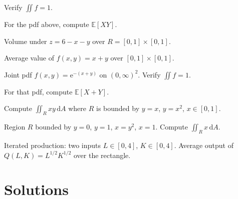 \begin{problems}
        Verify $\iint f=1$.
  \item For the pdf above, compute $\mathbb{E}[XY]$.
  \item Volume under $z=6-x-y$ over $R=[0,1]\times[0,1]$.
  \item Average value of $f(x,y)=x+y$ over $[0,1]\times[0,1]$.
  \item Joint pdf $f(x,y)=\mathrm{e}^{-(x+y)}$ on $(0,\infty)^{2}$.
        Verify $\iint f=1$.
  \item For that pdf, compute $\mathbb{E}[X+Y]$.
  \item Compute $\displaystyle\iint_{R} xy\,\mathrm{d}A$ where $R$ is
        bounded by $y=x$, $y=x^{2}$, $x\in[0,1]$.
  \item Region $R$ bounded by $y=0$, $y=1$, $x=y^{2}$, $x=1$. Compute
        $\displaystyle\iint_{R} x\,\mathrm{d}A$.
  \item Iterated production: two inputs $L\in[0,4]$, $K\in[0,4]$.
        Average output of $Q(L,K)=L^{1/2}K^{1/2}$ over the rectangle.
\end{problems}

\section{Solutions}

